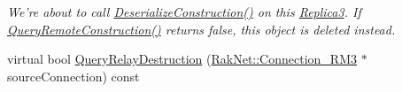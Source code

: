 \begin{DoxyCompactItemize}
\begin{DoxyCompactList}\small\item\em We're about to call \hyperlink{class_rak_net_1_1_replica3_composite_a387379441c90fcb6381d0227c42c5712}{Deserialize\-Construction()} on this \hyperlink{class_rak_net_1_1_replica3}{Replica3}. If \hyperlink{class_rak_net_1_1_replica3_composite_ae5f099064ed5168d7bb180aec8ca2eb5}{Query\-Remote\-Construction()} returns false, this object is deleted instead. \end{DoxyCompactList}\item 
\hypertarget{class_rak_net_1_1_replica3_composite_ad3aec02e8e9be3c1d2c85d5d5ed683fd}{virtual bool \hyperlink{class_rak_net_1_1_replica3_composite_ad3aec02e8e9be3c1d2c85d5d5ed683fd}{Query\-Relay\-Destruction} (\hyperlink{class_rak_net_1_1_connection___r_m3}{Rak\-Net\-::\-Connection\-\_\-\-R\-M3} $\ast$source\-Connection) const }\label{class_rak_net_1_1_replica3_composite_ad3aec02e8e9be3c1d2c85d5d5ed683fd}


\end{DoxyCompactItemize}
